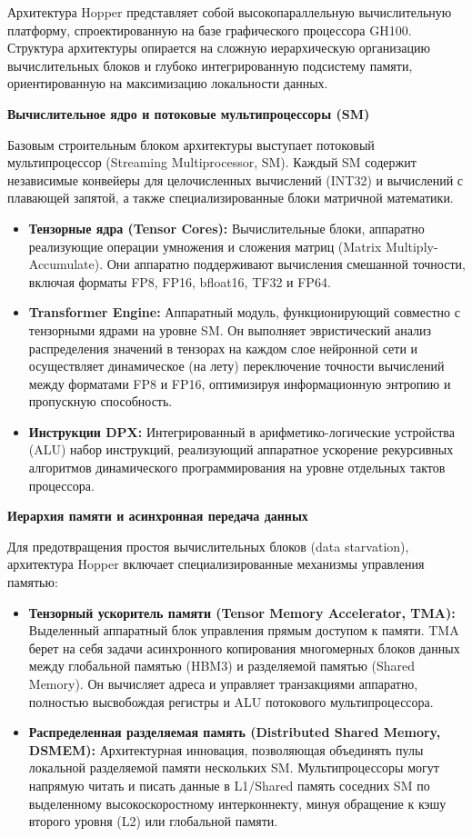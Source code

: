 \documentclass{article}[14pt]
\begin{document}
Архитектура Hopper представляет собой высокопараллельную вычислительную платформу, спроектированную на базе графического процессора GH100. 
Структура архитектуры опирается на сложную иерархическую организацию вычислительных блоков и глубоко интегрированную подсистему памяти, 
ориентированную на максимизацию локальности данных.

\medskip

\noindent \textbf{Вычислительное ядро и потоковые мультипроцессоры (SM)}

Базовым строительным блоком архитектуры выступает потоковый мультипроцессор (Streaming Multiprocessor, SM). Каждый SM содержит независимые 
конвейеры для целочисленных вычислений (INT32) и вычислений с плавающей запятой, а также специализированные блоки матричной математики.
\begin{itemize}
    \item \textbf{Тензорные ядра (Tensor Cores):} Вычислительные блоки, аппаратно реализующие операции умножения и сложения матриц 
	(Matrix Multiply-Accumulate). Они аппаратно поддерживают вычисления смешанной точности, включая форматы FP8, FP16, bfloat16, TF32 и FP64.
    \item \textbf{Transformer Engine:} Аппаратный модуль, функционирующий совместно с тензорными ядрами на уровне SM. Он выполняет 
	эвристический анализ распределения значений в тензорах на каждом слое нейронной сети и осуществляет динамическое (на лету) переключение 
	точности вычислений между форматами FP8 и FP16, оптимизируя информационную энтропию и пропускную способность.
    \item \textbf{Инструкции DPX:} Интегрированный в арифметико-логические устройства (ALU) набор инструкций, реализующий аппаратное 
	ускорение рекурсивных алгоритмов динамического программирования на уровне отдельных тактов процессора.
\end{itemize}

\medskip

\noindent \textbf{Иерархия памяти и асинхронная передача данных}

Для предотвращения простоя вычислительных блоков (data starvation), архитектура Hopper включает специализированные механизмы управления памятью:
\begin{itemize}
    \item \textbf{Тензорный ускоритель памяти (Tensor Memory Accelerator, TMA):} Выделенный аппаратный блок управления прямым доступом к памяти. 
	TMA берет на себя задачи асинхронного копирования многомерных блоков данных между глобальной памятью (HBM3) и разделяемой памятью 
	(Shared Memory). Он вычисляет адреса и управляет транзакциями аппаратно, полностью высвобождая регистры и ALU потокового мультипроцессора.
    \item \textbf{Распределенная разделяемая память (Distributed Shared Memory, DSMEM):} Архитектурная инновация, позволяющая объединять пулы 
	локальной разделяемой памяти нескольких SM. Мультипроцессоры могут напрямую читать и писать данные в L1/Shared память соседних SM по 
	выделенному высокоскоростному интерконнекту, минуя обращение к кэшу второго уровня (L2) или глобальной памяти.
\end{itemize}
\end{document}
